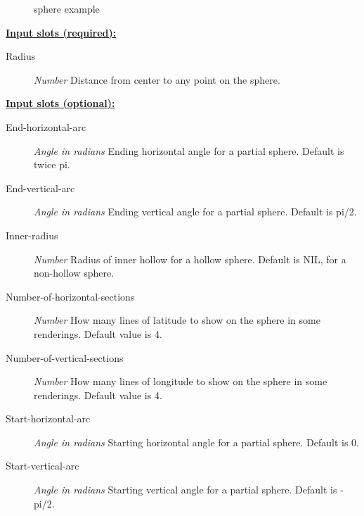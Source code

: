 \documentclass [11pt]{book}
\begin{document}
\begin{itemize}
\begin{figure}
\caption{sphere example}

\label{fig:sphere}

\end{figure}





\textbf{
\underline{Input slots (required):}}

\begin{description}

\item [Radius]
\emph{Number} Distance from center to any point on the sphere.


\end{description}






\textbf{
\underline{Input slots (optional):}}

\begin{description}

\item [End-horizontal-arc]
\emph{Angle in radians} Ending horizontal angle for a partial sphere. Default is twice pi.


\item [End-vertical-arc]
\emph{Angle in radians} Ending vertical angle for a partial sphere. Default is pi/2.


\item [Inner-radius]
\emph{Number} Radius of inner hollow for a hollow sphere. Default is NIL, for a non-hollow sphere.


\item [Number-of-horizontal-sections]
\emph{Number} How many lines of latitude to show on the sphere in some renderings. Default value is 4.


\item [Number-of-vertical-sections]
\emph{Number} How many lines of longitude to show on the sphere in some renderings. Default value is 4.


\item [Start-horizontal-arc]
\emph{Angle in radians} Starting horizontal angle for a partial sphere. Default is 0.


\item [Start-vertical-arc]
\emph{Angle in radians} Starting vertical angle for a partial sphere. Default is -pi/2.



\end{description}
\end{itemize}
\end{document}
